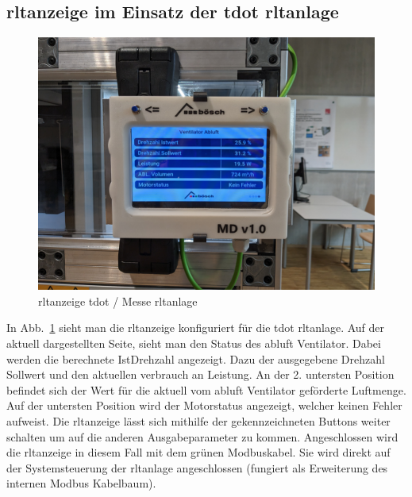\subsection{\ac{rltanzeige} im Einsatz der \gls{tdot} \ac{rltanlage}}
\begin{figure}[H]
	\centering
	\includegraphics[width=0.7\linewidth]{Bilder/tdot_anzeige}
	\caption{\ac{rltanzeige} \gls{tdot} / Messe \ac{rltanlage}} 
	\label{fig:tdot_anzeige}
\end{figure}

In Abb.~\ref{fig:tdot_anzeige} sieht man die \ac{rltanzeige} konfiguriert für die \gls{tdot} \ac{rltanlage}. Auf der aktuell dargestellten Seite, sieht man den Status des \gls{abluft} Ventilator. Dabei werden die berechnete IstDrehzahl angezeigt. Dazu der ausgegebene Drehzahl Sollwert und den aktuellen verbrauch an Leistung. An der 2. untersten Position befindet sich der Wert für die aktuell vom \gls{abluft} Ventilator geförderte Luftmenge. Auf der untersten Position wird der Motorstatus angezeigt, welcher keinen Fehler aufweist. Die \ac{rltanzeige} lässt sich mithilfe der gekennzeichneten Buttons weiter schalten um auf die anderen Ausgabeparameter zu kommen. Angeschlossen wird die \ac{rltanzeige} in diesem Fall mit dem grünen Modbuskabel. Sie wird direkt auf der Systemsteuerung der \ac{rltanlage} angeschlossen (fungiert als Erweiterung des internen Modbus Kabelbaum).

